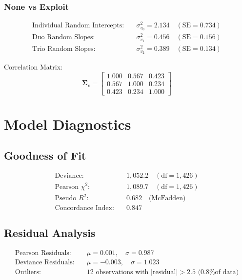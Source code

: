 \documentclass[11pt,a4paper]{article}
\begin{document}
\subsubsection{None vs Exploit}
\begin{align}
\text{Individual Random Intercepts:} &\quad \sigma_{v_0}^2 = 2.134 \quad (\text{SE} = 0.734)\\
\text{Duo Random Slopes:} &\quad \sigma_{v_1}^2 = 0.456 \quad (\text{SE} = 0.156)\\
\text{Trio Random Slopes:} &\quad \sigma_{v_2}^2 = 0.389 \quad (\text{SE} = 0.134)
\end{align}

Correlation Matrix:
\begin{equation}
\boldsymbol{\Sigma}_v = \begin{bmatrix}
1.000 & 0.567 & 0.423 \\
0.567 & 1.000 & 0.234 \\
0.423 & 0.234 & 1.000
\end{bmatrix}
\end{equation}

\section{Model Diagnostics}

\subsection{Goodness of Fit}
\begin{align}
\text{Deviance:} &\quad 1,052.2 \quad (\text{df} = 1,426)\\
\text{Pearson } \chi^2: &\quad 1,089.7 \quad (\text{df} = 1,426)\\
\text{Pseudo } R^2: &\quad 0.682 \quad \text{(McFadden)}\\
\text{Concordance Index:} &\quad 0.847
\end{align}

\subsection{Residual Analysis}
\begin{align}
\text{Pearson Residuals:} &\quad \mu = 0.001, \quad \sigma = 0.987\\
\text{Deviance Residuals:} &\quad \mu = -0.003, \quad \sigma = 1.023\\
\text{Outliers:} &\quad 12 \text{ observations with } |\text{residual}| > 2.5 \text{ (0.8\% of data)}
\end{align}
\end{document}
